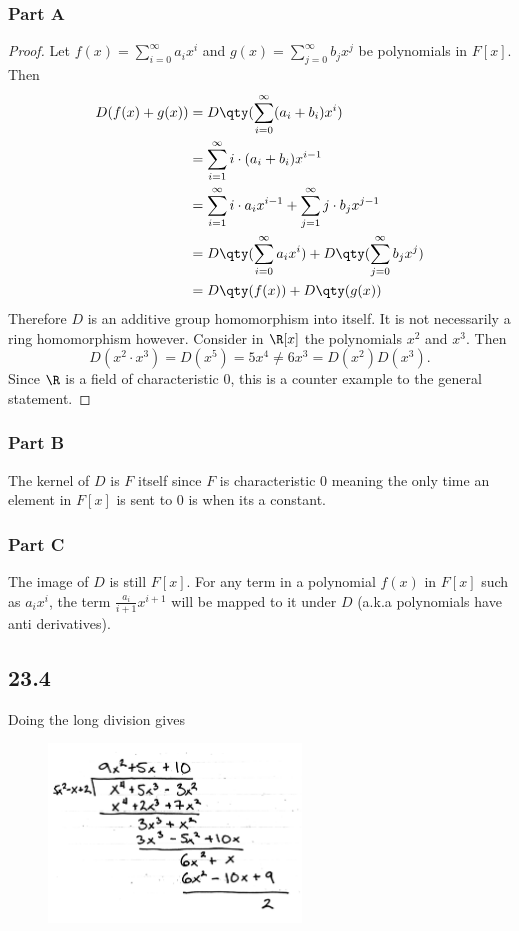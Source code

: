 \documentclass[12pt,titlepage]{extarticle}
\begin{document}
\subsubsection*{Part A}
\begin{proof}
    Let $f(x) = \sum_{i=0}^\infty a_i x^i$ and $g(x) = \sum_{j=0}^\infty b_j x^j$ be polynomials in $F[x]$. Then
    \begin{align*}
        D(f(x) + g(x)) &= D\qty(\sum_{i=0}^\infty (a_i + b_i) x^i) \\
                       &= \sum_{i=1}^\infty i \cdot (a_i + b_i) x^{i-1} \\
                       &= \sum_{i=1}^\infty i \cdot a_i x^{i-1} + \sum_{j=1}^\infty j \cdot b_j x^{j-1} \\
                       &= D\qty(\sum_{i=0}^\infty a_i x^{i}) + D\qty(\sum_{j=0}^\infty b_j x^{j}) \\
                       &= D\qty(f(x)) + D\qty(g(x))
    \end{align*}
    Therefore $D$ is an additive group homomorphism into itself. It is not necessarily a ring homomorphism however. Consider in $\R[x]$ the polynomials $x^2$ and $x^3$. Then
    \[
        D(x^2 \cdot x^3) = D(x^5) = 5x^4 \neq 6x^3 = D(x^2) D(x^3)
    .\]
    Since $\R$ is a field of characteristic $0$, this is a counter example to the general statement.
\end{proof}

\subsubsection*{Part B}
The kernel of $D$ is $F$ itself since $F$ is characteristic $0$ meaning the only time an element in $F[x]$ is sent to $0$ is when its a constant.

\subsubsection*{Part C}
The image of $D$ is still $F[x]$. For any term in a polynomial $f(x)$ in $F[x]$ such as $a_i x^i$, the term $\frac{a_i}{i+1} x^{i+1}$ will be mapped to it under $D$ (a.k.a polynomials have anti derivatives).

\subsection*{23.4}
Doing the long division gives
\begin{figure}[h!]
    \centering
    \includegraphics[page=1,width=0.6\textwidth]{longdiv.pdf}
\end{figure}
\end{document}
